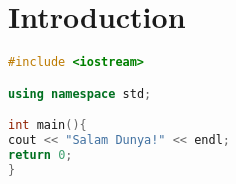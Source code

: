 \documentclass{article}
\begin{document}
\section{Introduction}
\lipsum[1]
\begin{lstlisting}[language={C++}]
#include <iostream>

using namespace std;

int main(){
cout << "Salam Dunya!" << endl;
return 0;
}
\end{lstlisting}
\end{document}

